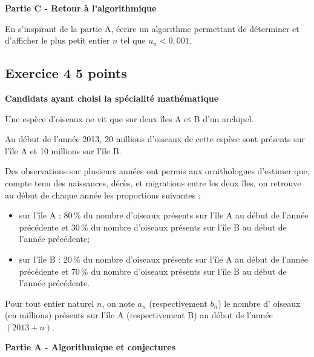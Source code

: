 \documentclass[10pt]{article}
\begin{document}
\bigskip

\textbf{Partie C - Retour à l'algorithmique }

En s'inspirant de la partie A, écrire un algorithme permettant de déterminer et d'afficher le plus petit entier $n$ tel que $u_{n} < 0,001$. 

\vspace{0,5cm}

\subsection*{Exercice 4 \hfill 5 points}

\textbf{Candidats ayant choisi la spécialité mathématique }

\medskip

Une espèce d'oiseaux ne vit que sur deux îles A et B d'un archipel.

Au début de l'année 2013, 20 millions d'oiseaux de cette espèce sont présents sur l'île A et 10 millions sur l'île B.

Des observations sur plusieurs années ont permis aux ornithologues d'estimer que, compte tenu des naissances, décès, et migrations entre les deux îles, on retrouve au début de chaque année les proportions suivantes : 
\begin{itemize}
\item sur l'île A : 80\,\% du nombre d'oiseaux présents sur l'île A au début de l'année précédente et 30\,\% du nombre d'oiseaux présents sur l'île B au début de l'année précédente;
\item sur l'île B : 20\,\% du nombre d'oiseaux présents sur l'île A au début de l'année précédente et  70\,\% du nombre d'oiseaux présents sur l'île B au début de l'année précédente.
\end{itemize}

\medskip

Pour tout entier naturel $n$, on note $a_{n}$ (respectivement $b_{n}$) le nombre d' oiseaux (en millions) présents sur l'île A (respectivement B) au début de l'année $(2013 + n)$.

\bigskip

\textbf{Partie A - Algorithmique et conjectures }

\medskip
\end{document}

